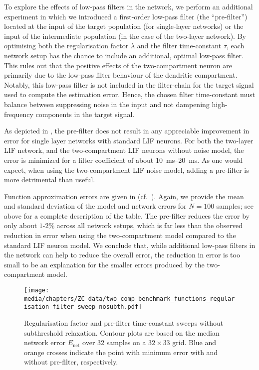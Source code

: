 To explore the effects of low-pass filters in the network, we perform an additional experiment in which we introduced a first-order low-pass filter (the \enquote{pre-filter}) located at the input of the target population (for single-layer networks) or the input of the intermediate population (in the case of the two-layer network).
By optimising both the regularisation factor $\lambda$ and the filter time-constant $\tau$, each network setup has the chance to include an additional, optimal low-pass filter.
This rules out that the positive effects of the two-compartment neuron are primarily due to the low-pass filter behaviour of the dendritic compartment.
Notably, this low-pass filter is not included in the filter-chain for the target signal used to compute the estimation error.
Hence, the chosen filter time-constant must balance between suppressing noise in the input and not dampening high-frequency components in the target signal.

As depicted in , the pre-filter does not result in any appreciable improvement in error for single layer networks with standard LIF neurons.
For both the two-layer LIF network, and the two-compartment LIF neurons without noise model, the error is minimized for a filter coefficient of about \SIrange{10}{20}{\milli\second}.
As one would expect, when using the two-compartment LIF noise model, adding a pre-filter is more detrimental than useful.

Function approximation errors are given in (cf.~).
Again, we provide the mean and standard deviation of the model and network errors for $N = 100$ samples; see above for a complete description of the table.
The pre-filter reduces the error by only about $1$-$2\%$ across all network setups, which is far less than the observed reduction in error when using the two-compartment model compared to the standard LIF neuron model.
We conclude that, while additional low-pass filters in the network can help to reduce the overall error, the reduction in error is too small to be an explanation for the smaller errors produced by the two-compartment model.

\begin{figure}[p]
	\texttt{[image: media/chapters/ZC\_data/two\_comp\_benchmark\_functions\_regularisation\_filter\_sweep\_nosubth.pdf]}
	\caption[Regularisation factor and pre-filter time-constant sweeps without subthreshold relaxation]{Regularisation factor and pre-filter time-constant sweeps without subthreshold relaxation. Contour plots are based on the median network error $E_\mathrm{net}$ over 32 samples on a $32 \times 33$ grid. Blue and orange crosses indicate the point with minimum error with and without pre-filter, respectively.}
	\label{fig:regularization_parameter_sweep_nosubth}
\end{figure}

